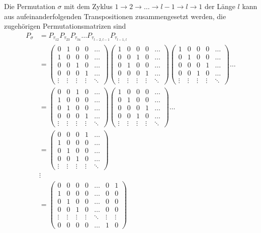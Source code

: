 Die Permutation $\sigma$ mit dem Zyklus $1\to 2\to\dots\to l-1\to l\to 1$
der Länge $l$ kann aus aufeinanderfolgenden Transpositionen zusammengesetzt
werden, die zugehörigen Permutationsmatrizen sind
\begin{align*}
P_\sigma
&=
P_{\tau_{12}}
P_{\tau_{23}}
P_{\tau_{34}}\dots
P_{\tau_{l-2,l-1}}
P_{\tau_{l-1,l}}
\\
&=
\begin{pmatrix}
0&1&0&0&\dots\\
1&0&0&0&\dots\\
0&0&1&0&\dots\\
0&0&0&1&\dots\\
\vdots&\vdots&\vdots&\vdots&\ddots
\end{pmatrix}
\begin{pmatrix}
1&0&0&0&\dots\\
0&0&1&0&\dots\\
0&1&0&0&\dots\\
0&0&0&1&\dots\\
\vdots&\vdots&\vdots&\vdots&\ddots
\end{pmatrix}
\begin{pmatrix}
1&0&0&0&\dots\\
0&1&0&0&\dots\\
0&0&0&1&\dots\\
0&0&1&0&\dots\\
\vdots&\vdots&\vdots&\vdots&\ddots
\end{pmatrix}
\dots
\\
&=
\begin{pmatrix}
0&0&1&0&\dots\\
1&0&0&0&\dots\\
0&1&0&0&\dots\\
0&0&0&1&\dots\\
\vdots&\vdots&\vdots&\vdots&\ddots
\end{pmatrix}
\begin{pmatrix}
1&0&0&0&\dots\\
0&1&0&0&\dots\\
0&0&0&1&\dots\\
0&0&1&0&\dots\\
\vdots&\vdots&\vdots&\vdots&\ddots
\end{pmatrix}
\dots
\\
&=
\begin{pmatrix}
0&0&0&1&\dots\\
1&0&0&0&\dots\\
0&1&0&0&\dots\\
0&0&1&0&\dots\\
\vdots&\vdots&\vdots&\vdots&\ddots
\end{pmatrix}
\\
&\vdots\\
&=
\begin{pmatrix}
0&0&0&0&\dots&0&1\\
1&0&0&0&\dots&0&0\\
0&1&0&0&\dots&0&0\\
0&0&1&0&\dots&0&0\\
\vdots&\vdots&\vdots&\vdots&\ddots&\vdots&\vdots\\
0&0&0&0&\dots&1&0
\end{pmatrix}
\end{align*}

